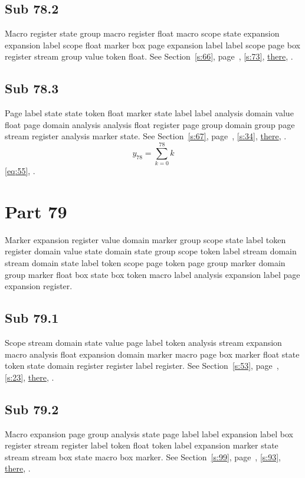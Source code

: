 \documentclass[11pt]{article}
\begin{document}
\subsection{Sub 78.2}\label{ss:78.2} Macro register state group macro register float macro scope state expansion expansion label scope float marker box page expansion label label scope page box register stream group value token float. See Section~\ref{s:66}, page~\pageref{ss:48.3}, \cref{s:73}, \hyperref[s:32]{there}, \cite{k3,k73}.
\subsection{Sub 78.3}\label{ss:78.3} Page label state state token float marker state label label analysis domain value float page domain analysis analysis float register page group domain group page stream register analysis marker state. See Section~\ref{s:67}, page~\pageref{ss:86.3}, \cref{s:34}, \hyperref[s:5]{there}, \cite{k3,k82}.
\begin{equation}y_{78}=\sum_{k=0}^{78}k\label{eq:78}\end{equation} \eqref{eq:55}, .
\section{Part 79}\label{s:79}
Marker expansion register value domain marker group scope state label token register domain value state domain state group scope token label stream domain stream domain state label token scope page token page group marker domain group marker float box state box token macro label analysis expansion label page expansion register.
\subsection{Sub 79.1}\label{ss:79.1} Scope stream domain state value page label token analysis stream expansion macro analysis float expansion domain marker macro page box marker float state token state domain register register label register. See Section~\ref{s:53}, page~\pageref{ss:94.2}, \cref{s:23}, \hyperref[s:84]{there}, \cite{k114,k90}.
\subsection{Sub 79.2}\label{ss:79.2} Macro expansion page group analysis state page label label expansion label box register stream register label token float token label expansion marker state stream stream box state macro box marker. See Section~\ref{s:99}, page~\pageref{ss:1.2}, \cref{s:93}, \hyperref[s:35]{there}, \cite{k24,k27}.
\end{document}
